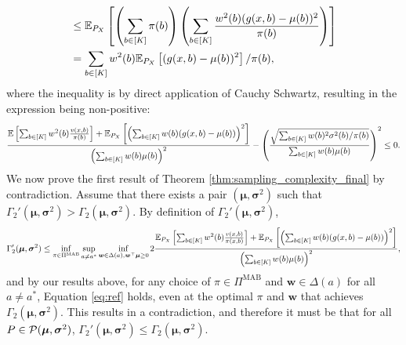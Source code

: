 \documentclass{article}
\begin{document}
\begin{appendices}
\begin{align}
    &\leq \mathbb{E}_{P_X}\left[\left(\sum_{b \in [K]}\pi(b) \right)\left(\sum_{b \in [K]}\frac{w^2(b)(g(x,b)-\mu(b))^2}{\pi(b)} \right)\right] \\ 
    &= \sum_{b \in [K]}w^2(b)\mathbb{E}_{P_X}\left[(g(x,b)- \mu(b))^2\right]/ \pi(b),
\end{align}
where the inequality is by direct application of Cauchy Schwartz, resulting in the expression being non-positive:
\begin{equation}\label{eq:ref}
    \frac{\mathbb{E}\left[\sum_{b \in [K]} w^2(b)\frac{v(x,b)}{\pi(b)}\right] + \mathbb{E}_{P_X}\left[\left(\sum_{b \in [K]} w(b) (g(x,b) - \mu(b))\right)^2\right]}{\left( \sum_{b \in [K]} w(b) \mu(b) \right)^2} - \left( \frac{\sqrt{\sum_{b \in [K]} w(b)^2\sigma^2(b)/\pi(b)}}{\sum_{b \in [K]}w(b) \mu(b)}\right)^2  \leq 0.
\end{equation}
We now prove the first result of Theorem \ref{thm:sampling_complexity_final} by contradiction. Assume that there exists a pair $(\bm{\mu}, \bm{\sigma}^2)$ such that $\Gamma_2'(\bm\mu, \bm\sigma^2) > \Gamma_2(\bm{\mu},\bm\sigma^2)$. By definition of $\Gamma_2'(\bm\mu, \bm\sigma^2)$, 
\begin{equation}
    \Gamma_2'(\boldsymbol\mu, \boldsymbol\sigma^2) \leq \inf_{\pi \in  \Pi^{\text{MAB}}}\sup_{a \neq a^*} \inf_{\boldsymbol{w} \in \Delta(a), \boldsymbol{w}^\top \boldsymbol\mu \geq 0}  2\frac{\mathbb{E}_{P_X}\left[\sum_{b \in [K]}w^2(b) \frac{v(x,b)}{\pi(x,b)}\right] + \mathbb{E}_{P_X}\left[\left(\sum_{b \in [K]} w(b) (g(x,b) - \mu(b))\right)^2\right]}{\left( \sum_{b \in [K]} w(b) \mu(b) \right)^2},
\end{equation}
and by our results above, for any choice of $\pi \in \Pi^{\text{MAB}}$ and $\bm{w} \in \Delta(a)$ for all $a \neq a^*$, Equation \ref{eq:ref} holds, even at the optimal $\pi$ and $\bm{w}$ that achieves $\Gamma_2(\bm\mu, \bm\sigma^2)$. This results in a contradiction, and therefore it must be that for all $P \in \mathcal{P}(\boldsymbol\mu, \boldsymbol\sigma^2)$, $\Gamma_2'(\bm\mu, \bm\sigma^2) \leq \Gamma_2(\bm{\mu},\bm\sigma^2)$.



\end{appendices}
\end{document}
